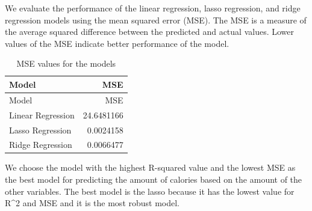 \documentclass[
]{article}
\newenvironment{Shaded}{\begin{snugshade}}{\end{snugshade}}
\newcommand{\AttributeTok}[1]{\textcolor[rgb]{0.13,0.29,0.53}{#1}}
\newcommand{\DecValTok}[1]{\textcolor[rgb]{0.00,0.00,0.81}{#1}}
\newcommand{\FunctionTok}[1]{\textcolor[rgb]{0.13,0.29,0.53}{\textbf{#1}}}
\newcommand{\NormalTok}[1]{#1}
\newcommand{\OtherTok}[1]{\textcolor[rgb]{0.56,0.35,0.01}{#1}}
\newcommand{\SpecialCharTok}[1]{\textcolor[rgb]{0.81,0.36,0.00}{\textbf{#1}}}
\newcommand{\StringTok}[1]{\textcolor[rgb]{0.31,0.60,0.02}{#1}}
\begin{document}
We evaluate the performance of the linear regression, lasso regression,
and ridge regression models using the mean squared error (MSE). The MSE
is a measure of the average squared difference between the predicted and
actual values. Lower values of the MSE indicate better performance of
the model.

\begin{Shaded}
\end{Shaded}

\begin{longtable}[]{@{}lr@{}}
\caption{MSE values for the models}\tabularnewline
\toprule\noalign{}
Model & MSE \\
\midrule\noalign{}
\endfirsthead
\toprule\noalign{}
Model & MSE \\
\midrule\noalign{}
\endhead
\bottomrule\noalign{}
\endlastfoot
Linear Regression & 24.6481166 \\
Lasso Regression & 0.0024158 \\
Ridge Regression & 0.0066477 \\
\end{longtable}

We choose the model with the highest R-squared value and the lowest MSE
as the best model for predicting the amount of calories based on the
amount of the other variables. The best model is the lasso because it
has the lowest value for R\^{}2 and MSE and it is the most robust model.
\end{document}

